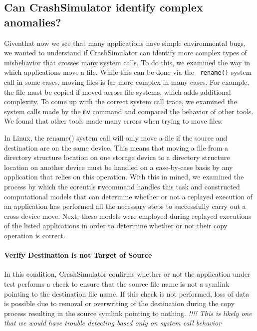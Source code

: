 \subsection{Can CrashSimulator identify complex anomalies?}

Giventhat now we see that many applications have simple environmental bugs,
we wanted to understand if CrashSimulator can identify more complex types
of misbehavior that crosses many system calls.  To do this, we examined the
way in which applications move a file.  While this can be done via the {\tt
rename()} system call in some cases, moving files is far more complex in
many cases.  For example, the file must be copied if moved across file
systems, which adds additional complexity.  To come up with the correct
system call trace, we examined the system calls made by the {\tt mv}
command and compared the behavior of other tools.  We found that other
tools made many errors when trying to move files.




        In Linux, the rename() system call will only move a file if the source and destination are on the same device.
        This means that moving a file from a directory structure location on one storage device to a directory structure location on
        another device must be handled on a case-by-case basis by any application that relies on this operation.  With
        this in mined, we examined the process by which the coreutils {\tt mv}command handles this task and constructed
        computational models that can determine whether or not a replayed execution of an application has performed all
        the necessary steps to successfully carry out a cross device move.  Next, these models were employed during
        replayed executions of the listed applications in order to determine whether or not their copy operation is correct.

        \paragraph{Verify Destination is not Target of Source}

        In this condition, CrashSimulator confirms whether or not the application under test performs a check to ensure
        that the source file name is not a symlink pointing to the destination file name.  If this check is not
        performed, loss of data is possible due to removal or overwriting of the destination during the copy process
        resulting in the source symlink pointing to nothing. \emph{!!!! This is likely one that we would have trouble
          detecting based only on system call behavior}

